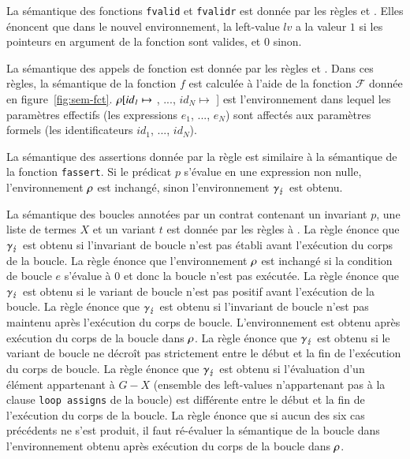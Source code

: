 La sémantique des fonctions \lstinline'fvalid' et \lstinline'fvalidr' est donnée
par les règles  et .
Elles énoncent que dans le nouvel environnement, la left-value $\mathit{lv}$ a
la valeur $1$ si les pointeurs en argument de la fonction sont valides, et $0$
sinon.

La sémantique des appels de fonction est donnée par les règles 
et .
Dans ces règles, la sémantique de la fonction $f$ est calculée à
l'aide de la fonction $\mathcal{F}$ donnée en figure~\ref{fig:sem-fct}.
$\rho[\mathit{id_1} \mapsto$ , ...,
  $\mathit{id_N} \mapsto$ ] est l'environnement
dans lequel les paramètres effectifs (les expressions $e_1$, ..., $e_N$) sont
affectés aux paramètres formels (les identificateurs
$\mathit{id_1}$, ..., $\mathit{id_N}$).

La sémantique des assertions \eacsl donnée par la règle  est
similaire à la sémantique de la fonction \lstinline'fassert'.
Si le prédicat $p$ s'évalue en une expression non nulle,
l'environnement $\rho$ est inchangé, sinon l'environnement $\gamma_\lightning$ est
obtenu.

La sémantique des boucles annotées par un contrat contenant un invariant
$p$, une liste de termes $X$ et un variant $t$ est
donnée par les règles  à .
La règle  énonce que $\gamma_\lightning$ est obtenu si l'invariant de
boucle n'est pas établi avant l'exécution du corps de la boucle.
La règle  énonce que l'environnement $\rho$ est inchangé si
la condition de boucle $e$ s'évalue à $0$ et donc la boucle n'est pas
exécutée.
La règle  énonce que $\gamma_\lightning$ est obtenu si le variant de
boucle n'est pas positif avant l'exécution de la boucle.
La règle  énonce que $\gamma_\lightning$ est obtenu si l'invariant de
boucle n'est pas maintenu après l'exécution du corps de boucle.
L'environnement  est obtenu après exécution du
corps de la boucle dans $\rho$.
La règle  énonce que $\gamma_\lightning$ est obtenu si le variant de
boucle ne décroît pas strictement entre le début et la fin de l'exécution du
corps de boucle.
La règle  énonce que $\gamma_\lightning$ est obtenu si l'évaluation
d'un élément appartenant à $G-X$ (ensemble des left-values n'appartenant pas à
la clause \lstinline'loop assigns' de la boucle) est différente entre le début
et la fin de l'exécution du corps de la boucle.
La règle  énonce que si aucun des six cas précédents ne s'est
produit, il faut ré-évaluer la sémantique de la boucle dans l'environnement
obtenu après exécution du corps de la boucle dans $\rho$.


